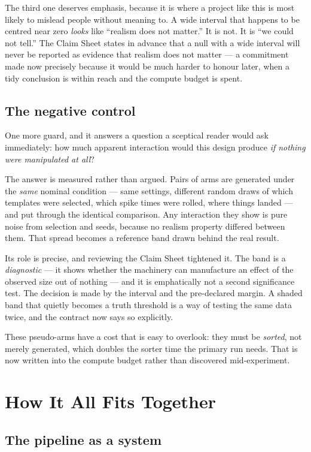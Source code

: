 \documentclass[12pt]{article}
\begin{document}
The third one deserves emphasis, because it is where a project like this is most likely to
mislead people without meaning to. A wide interval that happens to be centred near zero
\emph{looks} like ``realism does not matter.'' It is not. It is ``we could not tell.'' The
Claim Sheet states in advance that a null with a wide interval will never be reported as
evidence that realism does not matter --- a commitment made now precisely because it would be
much harder to honour later, when a tidy conclusion is within reach and the compute budget is
spent.

\subsection{The negative control}

One more guard, and it answers a question a sceptical reader would ask immediately: how much
apparent interaction would this design produce \emph{if nothing were manipulated at all}?

The answer is measured rather than argued. Pairs of arms are generated under the \emph{same}
nominal condition --- same settings, different random draws of which templates were selected,
which spike times were rolled, where things landed --- and put through the identical
comparison. Any interaction they show is pure noise from selection and seeds, because no
realism property differed between them. That spread becomes a reference band drawn behind the
real result.

Its role is precise, and reviewing the Claim Sheet tightened it. The band is a
\emph{diagnostic} --- it shows whether the machinery can manufacture an effect of the observed
size out of nothing --- and it is emphatically not a second significance test. The decision is
made by the interval and the pre-declared margin. A shaded band that quietly becomes a truth
threshold is a way of testing the same data twice, and the contract now says so explicitly.

These pseudo-arms have a cost that is easy to overlook: they must be \emph{sorted}, not merely
generated, which doubles the sorter time the primary run needs. That is now written into the
compute budget rather than discovered mid-experiment.

\section{How It All Fits Together}

\subsection{The pipeline as a system}
\end{document}
